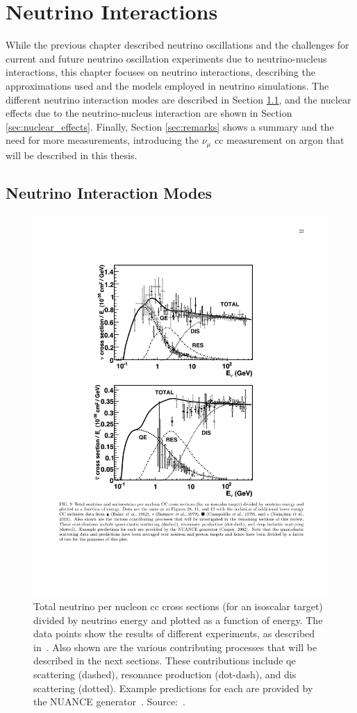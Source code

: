 \chapter{Neutrino Interactions}
\label{ch:neutrino_interactions}


While the previous chapter described neutrino oscillations and the challenges for current and future neutrino oscillation experiments due to neutrino-nucleus interactions, this chapter focuses on neutrino interactions, describing the approximations used and the models employed in neutrino simulations. The different neutrino interaction modes are described in Section \ref{sec:interaction_modes}, and the nuclear effects due to the neutrino-nucleus interaction are shown in Section \ref{sec:nuclear_effects}. Finally, Section \ref{sec:remarks} shows a summary and the need for more measurements, introducing the $\nu_\mu$ \acrshort{cc} measurement on argon that will be described in this thesis.



\section{Neutrino Interaction Modes}
\label{sec:interaction_modes}


\begin{figure}[t]
\centering
\includegraphics[width=.70\textwidth]{images/NeutrinoInteractions/all_xsec}
\caption[$\nu_\mu$ Charged Current Cross Section Measurements]{Total neutrino per nucleon \acrshort{cc} cross sections (for an isoscalar target) divided by neutrino energy and plotted as a function of energy. The data points show the results of different experiments, as described in~\cite{zeller}. Also shown are the various contributing processes that will be described in the next sections. These contributions include \acrshort{qe} scattering (dashed), resonance production (dot-dash), and \acrshort{dis} scattering (dotted). Example predictions for each are provided by the NUANCE generator~\cite{nuance}. Source:~\cite{zeller}.}
\label{fig:all_xsec}
\end{figure}


